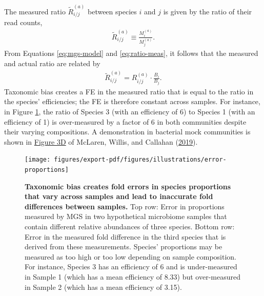 \documentclass[
]{article}
\begin{document}
The measured ratio \(\tilde R_{i/j}^{(a)}\) between species \(i\) and \(j\) is given by the ratio of their read counts,
\begin{align}
  \label{eq:ratio-meas}
  \tilde R_{i/j}^{(a)} \equiv \frac{M_{i}^{(a)}}{M_{j}^{(a)}}.
\end{align}
From Equations \eqref{eq:mgs-model} and \eqref{eq:ratio-meas}, it follows that the measured and actual ratio are related by
\begin{align}
  \label{eq:ratio-error}
  \tilde R_{i/j}^{(a)} = R_{i/j}^{(a)} \cdot \frac{B_i}{B_j}.
\end{align}
Taxonomic bias creates a FE in the measured ratio that is equal to the ratio in the species' efficiencies; the FE is therefore constant across samples.
For instance, in Figure \ref{fig:error-proportions}, the ratio of Species 3 (with an efficiency of 6) to Species 1 (with an efficiency of 1) is over-measured by a factor of 6 in both communities despite their varying compositions.
A demonstration in bacterial mock communities is shown in \href{https://doi.org/10.7554/eLife.46923.004}{Figure 3D} of McLaren, Willis, and Callahan (\protect\hyperlink{ref-mclaren2019cons}{2019}).

\begin{figure}
\texttt{[image: figures/export-pdf/figures/illustrations/error-proportions]} \caption{\textbf{Taxonomic bias creates fold errors in species proportions that vary across samples and lead to inaccurate fold differences between samples.} Top row: Error in proportions measured by MGS in two hypothetical microbiome samples that contain different relative abundances of three species. Bottom row: Error in the measured fold difference in the third species that is derived from these measurements. Species' proportions may be measured as too high or too low depending on sample composition. For instance, Species 3 has an efficiency of 6 and is under-measured in Sample 1 (which has a mean efficiency of 8.33) but over-measured in Sample 2 (which has a mean efficiency of 3.15).}\label{fig:error-proportions}
\end{figure}
\end{document}
